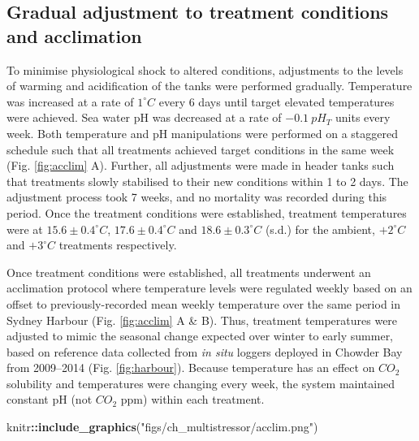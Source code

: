 \documentclass[oneside, a4paper]{memoir}
\newenvironment{Shaded}{\begin{snugshade}}{\end{snugshade}}
\newcommand{\KeywordTok}[1]{\textcolor[rgb]{0.13,0.29,0.53}{\textbf{#1}}}
\newcommand{\StringTok}[1]{\textcolor[rgb]{0.31,0.60,0.02}{#1}}
\newcommand{\OperatorTok}[1]{\textcolor[rgb]{0.81,0.36,0.00}{\textbf{#1}}}
\newcommand{\NormalTok}[1]{#1}
\theoremstyle{definition}
\theoremstyle{definition}
\theoremstyle{definition}
\theoremstyle{remark}
\begin{document}
\subsection{Gradual adjustment to treatment conditions and
acclimation}\label{gradual-adjustment-to-treatment-conditions-and-acclimation}

To minimise physiological shock to altered conditions, adjustments to
the levels of warming and acidification of the tanks were performed
gradually. Temperature was increased at a rate of \(1^{\circ}C\) every 6
days until target elevated temperatures were achieved. Sea water pH was
decreased at a rate of \(-0.1\ pH_T\) units every week. Both temperature
and pH manipulations were performed on a staggered schedule such that
all treatments achieved target conditions in the same week (Fig.
\ref{fig:acclim} A). Further, all adjustments were made in header tanks
such that treatments slowly stabilised to their new conditions within 1
to 2 days. The adjustment process took 7 weeks, and no mortality was
recorded during this period. Once the treatment conditions were
established, treatment temperatures were at \(15.6 \pm 0.4^{\circ}C\),
\(17.6 \pm 0.4^{\circ}C\) and \(18.6 \pm 0.3^{\circ}C\) (s.d.) for the
ambient, \(+2^{\circ}C\) and \(+3^{\circ}C\) treatments respectively.

Once treatment conditions were established, all treatments underwent an
acclimation protocol where temperature levels were regulated weekly
based on an offset to previously-recorded mean weekly temperature over
the same period in Sydney Harbour (Fig. \ref{fig:acclim} A \& B). Thus,
treatment temperatures were adjusted to mimic the seasonal change
expected over winter to early summer, based on reference data collected
from \emph{in situ} loggers deployed in Chowder Bay from 2009--2014
(Fig. \ref{fig:harbour}). Because temperature has an effect on \(CO_2\)
solubility and temperatures were changing every week, the system
maintained constant pH (not \(CO_2\) ppm) within each treatment.

\begin{Shaded}
\begin{Highlighting}[]
\NormalTok{knitr}\OperatorTok{::}\KeywordTok{include_graphics}\NormalTok{(}\StringTok{"figs/ch_multistressor/acclim.png"}\NormalTok{)}
\end{Highlighting}
\end{Shaded}
\end{document}
